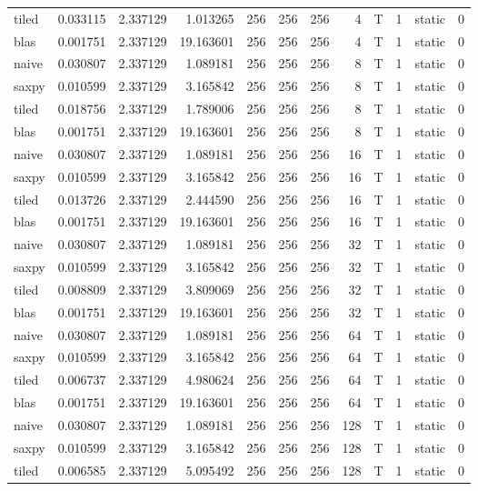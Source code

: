 \documentclass[
  12pt,
  xcolor = usenames,dvipsnames]{article}
\begin{document}
\begin{table}[!h]
{\begin{tabular}[t]{lrrrrrrrlrlr}
tiled & 0.033115 & 2.337129 & 1.013265 & 256 & 256 & 256 & 4 & T & 1 & static & 0\\
blas & 0.001751 & 2.337129 & 19.163601 & 256 & 256 & 256 & 4 & T & 1 & static & 0\\
\addlinespace
naive & 0.030807 & 2.337129 & 1.089181 & 256 & 256 & 256 & 8 & T & 1 & static & 0\\
saxpy & 0.010599 & 2.337129 & 3.165842 & 256 & 256 & 256 & 8 & T & 1 & static & 0\\
tiled & 0.018756 & 2.337129 & 1.789006 & 256 & 256 & 256 & 8 & T & 1 & static & 0\\
blas & 0.001751 & 2.337129 & 19.163601 & 256 & 256 & 256 & 8 & T & 1 & static & 0\\
naive & 0.030807 & 2.337129 & 1.089181 & 256 & 256 & 256 & 16 & T & 1 & static & 0\\
\addlinespace
saxpy & 0.010599 & 2.337129 & 3.165842 & 256 & 256 & 256 & 16 & T & 1 & static & 0\\
tiled & 0.013726 & 2.337129 & 2.444590 & 256 & 256 & 256 & 16 & T & 1 & static & 0\\
blas & 0.001751 & 2.337129 & 19.163601 & 256 & 256 & 256 & 16 & T & 1 & static & 0\\
naive & 0.030807 & 2.337129 & 1.089181 & 256 & 256 & 256 & 32 & T & 1 & static & 0\\
saxpy & 0.010599 & 2.337129 & 3.165842 & 256 & 256 & 256 & 32 & T & 1 & static & 0\\
\addlinespace
tiled & 0.008809 & 2.337129 & 3.809069 & 256 & 256 & 256 & 32 & T & 1 & static & 0\\
blas & 0.001751 & 2.337129 & 19.163601 & 256 & 256 & 256 & 32 & T & 1 & static & 0\\
naive & 0.030807 & 2.337129 & 1.089181 & 256 & 256 & 256 & 64 & T & 1 & static & 0\\
saxpy & 0.010599 & 2.337129 & 3.165842 & 256 & 256 & 256 & 64 & T & 1 & static & 0\\
tiled & 0.006737 & 2.337129 & 4.980624 & 256 & 256 & 256 & 64 & T & 1 & static & 0\\
\addlinespace
blas & 0.001751 & 2.337129 & 19.163601 & 256 & 256 & 256 & 64 & T & 1 & static & 0\\
naive & 0.030807 & 2.337129 & 1.089181 & 256 & 256 & 256 & 128 & T & 1 & static & 0\\
saxpy & 0.010599 & 2.337129 & 3.165842 & 256 & 256 & 256 & 128 & T & 1 & static & 0\\
tiled & 0.006585 & 2.337129 & 5.095492 & 256 & 256 & 256 & 128 & T & 1 & static & 0\\

\end{tabular}}
\end{table}
\end{document}
